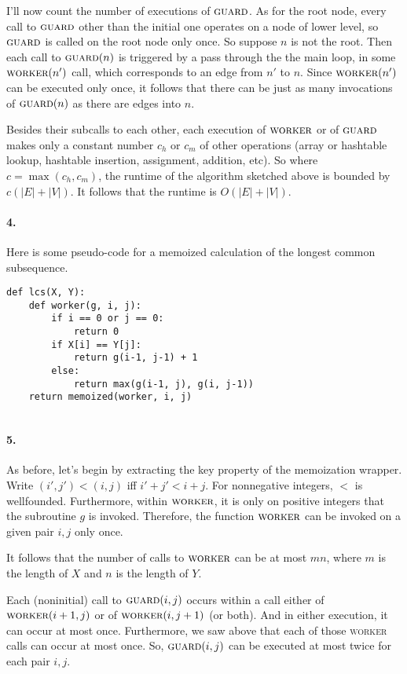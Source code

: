 \documentclass[
]{article}
\newcommand{\tsc}[1]{\ensuremath{\textsc{#1}}}
\begin{document}
I'll now count the number of executions of $\tsc{guard}$.  As for the root node, every call to $\tsc{guard}$ other than the initial one operates on a node of lower level, so $\tsc{guard}$ is called on the root node only once.  So suppose $n$ is not the root. Then each call to $\tsc{guard}(n)$ is triggered by a pass through the the main loop, in some $\tsc{worker}(n')$ call, which corresponds to an edge from $n'$ to $n$.  Since $\tsc{worker}(n')$ can be executed only once, it follows that there can be just as many invocations of $\tsc{guard}(n)$ as there are edges into $n$.  

Besides their subcalls to each other, each execution of \tsc{worker} or of \tsc{guard} makes only a constant number $c_h$ or $c_m$ of other operations (array or hashtable lookup, hashtable insertion, assignment, addition, etc).  So where $c=\max(c_h,c_m)$, the runtime of the algorithm sketched above is bounded by $c(|E| + |V|)$.  It follows that the runtime is $O(|E|+|V|)$.



\paragraph{4.} Here is some pseudo-code for a memoized calculation of the longest common subsequence.
\begin{verbatim}
def lcs(X, Y):
    def worker(g, i, j):
        if i == 0 or j == 0:        
            return 0
        if X[i] == Y[j]:
            return g(i-1, j-1) + 1
        else:
            return max(g(i-1, j), g(i, j-1))
    return memoized(worker, i, j)
                   
\end{verbatim}

\paragraph{5.} As before, let's begin by extracting the key property of the memoization wrapper.  Write $(i',j')<(i,j)$ iff $i'+j'<i+j$.  For nonnegative integers, $<$ is wellfounded.  Furthermore, within \tsc{worker}, it is only on positive integers that the subroutine $g$ is invoked.  Therefore, the function \tsc{worker} can be invoked on a given pair $i,j$ only once.  

It follows that the number of calls to \tsc{worker} can be at most $mn$, where $m$ is the length of $X$ and $n$ is the length of $Y$.


Each (noninitial) call to $\tsc{guard}(i,j)$ occurs within a call either of $\tsc{worker}(i+1, j)$ or of $\tsc{worker}(i, j+1)$ (or both).   And in either execution, it can occur at most once.  
Furthermore, we saw above that each of those \textsc{worker} calls can occur at most once. So, $\tsc{guard}(i,j)$ can be executed at most twice for each pair $i,j$.  
\end{document}
